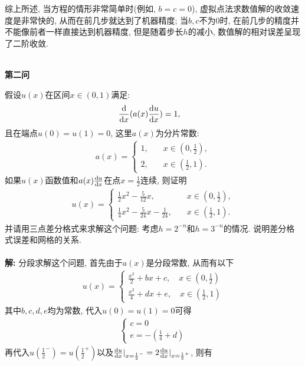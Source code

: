 \documentclass[12pt]{article}
\begin{document}
\noindent 综上所述, 当方程的情形非常简单时(例如, $b=c=0$), 虚拟点法求数值解的收敛速度是非常快的, 从而在前几步就达到了机器精度; 当$b,c$不为0时, 在前几步的精度并不能像前者一样直接达到机器精度, 但是随着步长$h$的减小, 数值解的相对误差呈现了二阶收敛.\\
\quad \\

\begin{center}
	\textbf{第二问}
\end{center}
\noindent 假设$u(x)$在区间$x\in(0,1)$满足:
\begin{align*}
	\frac{{\rm d}}{{\rm d}x}(a(x)\frac{{\rm d}u}{{\rm d}x})&=1,
\end{align*}
\noindent 且在端点$u(0)=u(1)=0$, 这里$a(x)$为分片常数:
\begin{align*}
	a(x)=\begin{cases}
		1,\quad &x\in(0,\frac{1}{2}),\\
		2,\quad &x\in(\frac{1}{2},1).
	\end{cases}
\end{align*}
\noindent 如果$u(x)$函数值和$a(x)\frac{{\rm d}u}{{\rm d}x}$在点$x=\frac{1}{2}$连续, 则证明
\begin{align*}
	u(x)=\begin{cases}
		\frac{1}{2}x^2-\frac{5}{12}x,&x\in(0,\frac{1}{2}),\\
		\frac{1}{4}x^2-\frac{5}{24}x-\frac{1}{24},\quad &x\in(\frac{1}{2},1).
	\end{cases}
\end{align*}
\noindent 并请用三点差分格式来求解这个问题: 考虑$h=2^{-n}$和$h=3^{-n}$的情况. 说明差分格式误差和网格的关系.\\
\quad \\
\textbf{解:} 分段求解这个问题, 首先由于$a(x)$是分段常数, 从而有以下
\begin{align*}
	u(x)=\begin{cases}
		\frac{x^2}{2}+bx+c,\quad x\in(0,\frac{1}{2})\\
		\frac{x^2}{4}+dx+e,\quad x\in(\frac{1}{2},1)
	\end{cases}
\end{align*}
\noindent 其中$b,c,d,e$均为常数, 代入$u(0)=u(1)=0$可得
\begin{align*}
	\begin{cases}
		c=0\\
		e=-(\frac{1}{4}+d)
	\end{cases}
\end{align*}
\noindent 再代入$u(\frac{1}{2}^-)=u(\frac{1}{2}^+)$以及$\frac{{\rm d}u}{{\rm d}x}\vert_{x=\frac{1}{2}^-}=2\frac{{\rm d}u}{{\rm d}x}\vert_{x=\frac{1}{2}^+}$, 则有
\end{document}
